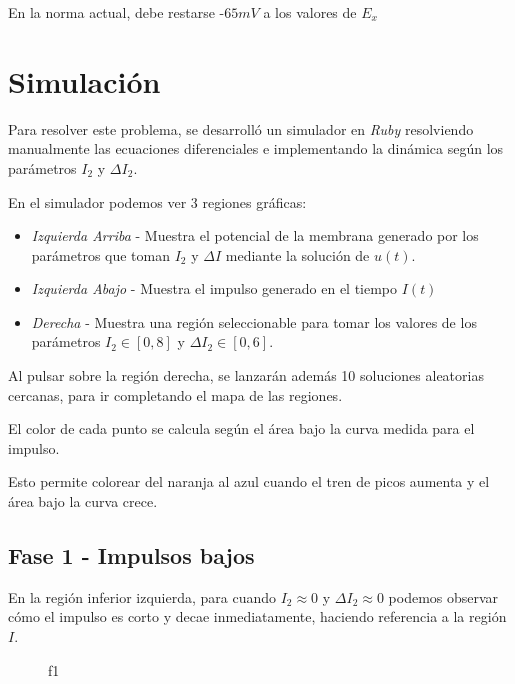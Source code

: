 \documentclass[11pt]{article}
\providecommand{\tightlist}{%
      \setlength{\itemsep}{0pt}\setlength{\parskip}{0pt}}
\begin{document}
En la norma actual, debe restarse -\(65 mV\) a los valores de \(E_x\)

    \section{Simulación}\label{simulaciuxf3n}

    Para resolver este problema, se desarrolló un simulador en \emph{Ruby}
resolviendo manualmente las ecuaciones diferenciales e implementando la
dinámica según los parámetros \(I_2\) y \(\Delta I_2\).

En el simulador podemos ver 3 regiones gráficas:

\begin{itemize}
\tightlist
\item
  \emph{Izquierda Arriba} - Muestra el potencial de la membrana generado
  por los parámetros que toman \(I_2\) y \(\Delta I\) mediante la
  solución de \(u(t)\).
\item
  \emph{Izquierda Abajo} - Muestra el impulso generado en el tiempo
  \(I(t)\)
\item
  \emph{Derecha} - Muestra una región seleccionable para tomar los
  valores de los parámetros \(I_2 \in [0, 8]\) y
  \(\Delta I_2 \in [0, 6]\).
\end{itemize}

Al pulsar sobre la región derecha, se lanzarán además 10 soluciones
aleatorias cercanas, para ir completando el mapa de las regiones.

El color de cada punto se calcula según el área bajo la curva medida
para el impulso.

Esto permite colorear del naranja al azul cuando el tren de picos
aumenta y el área bajo la curva crece.

    \subsection{Fase 1 - Impulsos bajos}\label{fase-1---impulsos-bajos}

En la región inferior izquierda, para cuando \(I_2 \approx 0\) y
\(\Delta I_2 \approx 0\) podemos observar cómo el impulso es corto y
decae inmediatamente, haciendo referencia a la región \(I\).

    \begin{figure}
\centering
{}
\caption{f1}
\end{figure}
\end{document}
